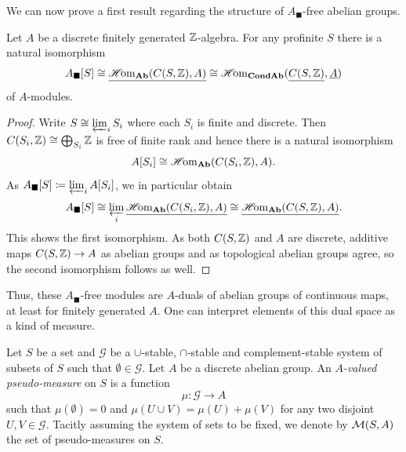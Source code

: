 We can now prove a first result regarding the structure of $A_\blacksquare$-free abelian groups.
\begin{lemma}
	\label{lemma: finitely-free A-solid modules as A-duals}
	
	Let $A$ be a discrete finitely generated ${\mathbb{Z}}$-algebra. For any profinite $S$ there is a natural isomorphism
		$${A_\blacksquare[S]} \cong \underline{{\operatorname{\mathscr{H}\!om}}_{{\mathbf{Ab}}}({C(S, {\mathbb{Z}})}, A)}\cong {\operatorname{\mathscr{H}\!om}}_{{{\mathbf{Cond}}}{{\mathbf{Ab}}}}(\underline{{C(S, {\mathbb{Z}})}}, \underline{A})$$
	of $A$-modules.
\end{lemma}
\begin{proof}
	Write $S\cong \varprojlim_i S_i$ where each $S_i$ is finite and discrete. Then ${C(S_i, {\mathbb{Z}})}\cong \bigoplus_{S_i} {\mathbb{Z}}$ is free of finite rank and hence there is a natural isomorphism
		$${A[S_i]}\cong {\operatorname{\mathscr{H}\!om}}_{{\mathbf{Ab}}}({C(S_i, {\mathbb{Z}})}, A).$$
	As ${A_\blacksquare[S]} \coloneqq \varprojlim_i {A[S_i]}$, we in particular obtain
		$${A_\blacksquare[S]}\cong \varprojlim_i \underline{{\operatorname{\mathscr{H}\!om}}_{{\mathbf{Ab}}}({C(S_i, {\mathbb{Z}})}, A)}\cong \underline{{\operatorname{\mathscr{H}\!om}}_{{\mathbf{Ab}}}({C(S, {\mathbb{Z}})}, A)}.$$
	This shows the first isomorphism. As both ${C(S, {\mathbb{Z}})}$ and $A$ are discrete, additive maps ${C(S, {\mathbb{Z}})}\to A$ as abelian groups and as topological abelian groups agree, so the second isomorphism follows as well.
\end{proof}

Thus, these $A_\blacksquare$-free modules are $A$-duals of abelian groups of continuous maps, at least for finitely generated $A$. One can interpret elements of this dual space as a kind of measure.
\begin{definition}
	Let $S$ be a set and $\mathcal{G}$ be a $\cup$-stable, $\cap$-stable and complement-stable system of subsets of $S$ such that $\emptyset\in \mathcal{G}$. Let $A$ be a discrete abelian group. An \emph{$A$-valued pseudo-measure} on $S$ is a function
		$$\mu\colon \mathcal{G} \to A$$
	such that $\mu(\emptyset)=0$ and $\mu(U\cup V) = \mu(U) + \mu(V)$ for any two disjoint $U, V\in\mathcal{G}$. Tacitly assuming the system of sets to be fixed, we denote by ${\mathcal{M}(S, A)}$ the set of pseudo-measures on $S$.
\end{definition}

